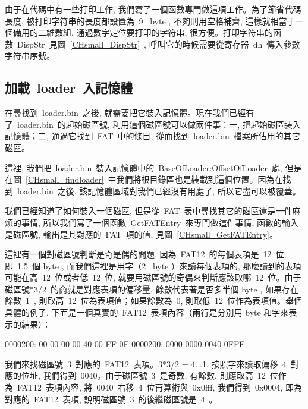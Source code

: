 由于在代碼中有一些打印工作, 我們寫了一個函數專門做這項工作。為了節省代碼長度, 被打印字符串的長度都設置為~9~ byte , 不夠則用空格補齊, 這樣就相當于一個備用的二維數組, 通過數字定位要打印的字符串, 很方便。打印字符串的函數~DispStr~見圖~\ref{CHsmall_DispStr}~, 呼叫它的時候需要從寄存器~dh~傳入參數字符串序號。

\label{CHsmall_DispStr}

\subsection{加載~loader~入記憶體}

在尋找到~loader.bin~之後, 就需要把它裝入記憶體。現在我們已經有了~loader.bin~的起始磁區號, 利用這個磁區號可以做兩件事：一, 把起始磁區裝入記憶體；二, 通過它找到~FAT~中的條目, 從而找到~loader.bin~檔案所佔用的其它磁區。

這裡, 我們把~loader.bin~裝入記憶體中的~BaseOfLoader:OffsetOfLoader~處, 但是在圖~\ref{CHsmall_findloader}~中我們將根目錄區也是裝載到這個位置。因為在找到~loader.bin~之後, 該記憶體區域對我們已經沒有用處了, 所以它盡可以被覆蓋。

我們已經知道了如何裝入一個磁區, 但是從~FAT~表中尋找其它的磁區還是一件麻煩的事情, 所以我們寫了一個函數~GetFATEntry~來專門做這件事情, 函數的輸入是磁區號, 輸出是其對應的~FAT~項的值, 見圖~\ref{CHsmall_GetFATEntry}。

\label{CHsmall_GetFATEntry}

這裡有一個對磁區號判斷是奇是偶的問題, 因為~FAT12~的每個表項是~12~位, 即~1.5~個 byte , 而我們這裡是用字（2~ byte ）來讀每個表項的, 那麼讀到的表項可能在高~12~位或者低~12~位, 就要用磁區號的奇偶來判斷應該取哪~12~位。由于磁區號*3/2~的商就是對應表項的偏移量, 餘數代表著是否多半個 byte , 如果存在餘數~1~, 則取高~12~位為表項值；如果餘數為~0, 則取低~12~位作為表項值。舉個具體的例子, 下面是一個真實的~FAT12~表項內容（兩行是分別用 byte 和字來表示的結果）：
\begin{Command}
0000200: 00 00 00 00 40 00 FF 0F
0000200:  0000  0000  0040  0FFF
\end{Command}
我們來找磁區號~3~對應的~FAT12~表項。3*3/2 = 4...1, 按照字來讀取偏移~4~對應的位址, 我們得到~0040。由于磁區號~3~是奇數, 有餘數, 則應取高~12~位作為~FAT12~表項內容, 將~0040~右移~4~位再算術與~0x0fff, 我們得到~0x0004, 即為對應的~FAT12~表項, 說明磁區號~3~的後繼磁區號是~4~。

